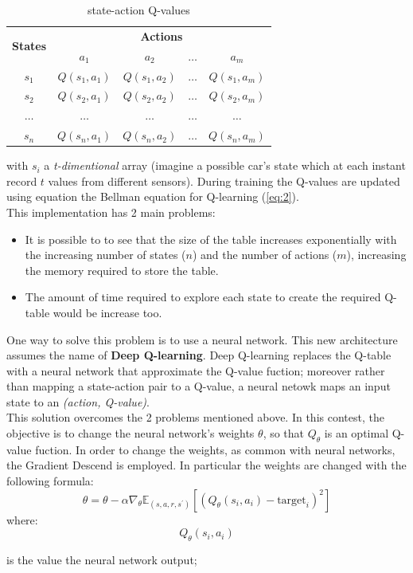 \documentclass[14pt]{extarticle}
\def\pp{\vspace{10pt}\newline}
\def\ppn{\vspace{10pt}}
\begin{document}
\begin{flushleft}
\begin{table}[H]
\centering
\begin{tabular}{|c|c|c|c|c|}
\hline
\multirow{2}{*}{\textbf{States}} & \multicolumn{4}{c|}{\textbf{Actions}}                                \\ \cline{2-5} 
                                 & \textbf{$a_1$} & \textbf{$a_2$} & \textbf{$\dotso$} & \textbf{$a_m$} \\ \hline
$s_1$  				& $Q(s_1,a_1)$   				& $Q(s_1,a_2)$  				&  $\dotso$  				& $Q(s_1,a_m)$                \\ \hline
$s_2$  				& $Q(s_2,a_1)$   				& $Q(s_2,a_2)$  				&  $\dotso$  				& $Q(s_2,a_m)$                \\ \hline
$\dotso$      &  $\dotso$              	& $\dotso$              	&  $\dotso$              & $\dotso$              \\ \hline
$s_n$  				& $Q(s_n,a_1)$   				& $Q(s_n,a_2)$  				&  $\dotso$  				& $Q(s_n,a_m)$                \\ \hline
\end{tabular}
\caption{state-action Q-values}
\label{tab:my-table}
\end{table}
with $s_i$ a \emph{t-dimentional} array (imagine a possible car's state which at each instant record $t$ values from different sensors).
During training the Q-values are updated using equation the Bellman equation for Q-learning (\ref{eq:2}).
\\
This implementation has 2 main problems:
\begin{itemize}
\item It is possible to to see that the size of the table increases exponentially with the increasing number of states ($n$) and the number of actions ($m$), increasing the memory required to store the table.
\item The amount of time required to explore each state to create the required Q-table would be increase too.
\end{itemize}

\ppn
One way to solve this problem is to use a neural network. This new architecture assumes the name of \textbf{Deep Q-learning}. Deep Q-learning replaces the Q-table with a neural network that approximate the Q-value fuction; moreover rather than mapping a state-action pair to a Q-value, a neural netowk maps an input state to an \emph{(action, Q-value)}.
\\
This solution overcomes the 2 problems mentioned above.
\pp
In this contest, the objective is to change the neural network's weights $\theta$, so that $Q_{\theta}$ is an optimal Q-value fuction. In order to change the weights, as common with neural networks, the Gradient Descend is employed. In particular the weights are changed with the following formula:
\[ \theta = \theta - \alpha\nabla_{\theta}\mathbb{E}_{(s,a,r,s^\prime)}[(Q_{\theta}(s_i,a_i) - \text{target}_i)^2]\]
where:
\[Q_{\theta}(s_i,a_i)\]
\vspace{-13mm}
\begin{center}
is the value the neural network output;
\end{center}


\end{flushleft}
\end{document}
